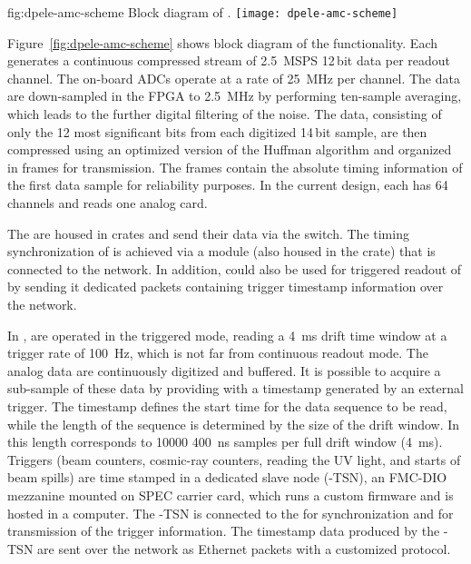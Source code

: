 \begin{dunefigure}{fig:dpele-amc-scheme}
{Block diagram of .}
\texttt{[image: dpele-amc-scheme]}
\end{dunefigure}
Figure~\ref{fig:dpele-amc-scheme} shows block diagram of the  functionality. Each  generates a continuous compressed stream of \SI{2.5}{MSPS} \num{12}\,bit data per readout channel. The on-board ADCs operate at a rate of \SI{25}{\MHz} per channel. The data are down-sampled in the FPGA to \SI{2.5}{\MHz} by performing ten-sample averaging, which leads to the further digital filtering of the noise. The data, consisting of only the  \num{12} most significant bits from each digitized \num{14}\,bit sample, are then compressed using an optimized version of the Huffman algorithm and organized in frames for transmission.  The frames contain the absolute timing information of the first data sample for reliability purposes. In the current design, each  has \num{64} channels and reads one analog  card.

The  are housed in  crates and send their data via the  switch. The timing synchronization of  is achieved via a  module (also housed in the crate) that is connected to the  network. In addition,  could also be used for triggered readout of  by sending it dedicated packets containing trigger timestamp information over the  network.

In ,  are operated in the triggered mode, reading a \SI{4}{\milli\second} drift time window at a trigger rate of \SI{100}{Hz}, which is not far from %
continuous readout mode. The analog data are continuously digitized and buffered. It is possible to acquire a sub-sample of these data %
by providing  with a timestamp generated by an external trigger. The timestamp defines the start time for the data sequence to be read, while the length of the sequence is determined by the size of the drift window. In  this length corresponds to \num{10000} \SI{400}{\nano\second} samples per full drift window (\SI{4}{\milli\second}). 
 Triggers (beam counters, cosmic-ray counters,  reading the UV light, and starts of beam spills) are time stamped in a dedicated  slave node (-TSN), an FMC-DIO mezzanine mounted on  SPEC carrier card, which runs a custom firmware and is hosted in a computer. The -TSN is connected to the  for synchronization and for transmission of the trigger information. The timestamp data produced by the -TSN are sent over the  network as Ethernet packets with a customized protocol. 

